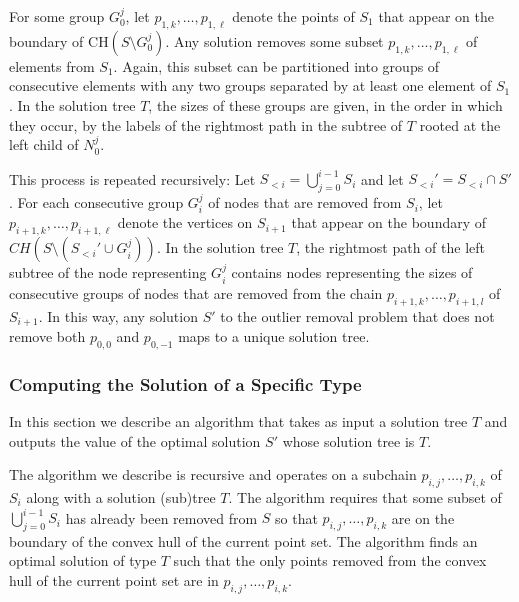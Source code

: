 \documentclass[lotsofwhite]{patmorin}
\newcommand{\ch}{\mathrm{CH}}
\begin{document}
For some group $G_0^j$, let $p_{1,k}, \ldots, p_{1,\ell}$ denote the
points of $S_1$ that appear on the boundary of $\ch(S\setminus
G_0^j)$.  Any solution removes some subset $p_{1,k},\ldots,
p_{1,\ell}$ of elements from $S_1$.  Again, this subset can be
partitioned into groups of consecutive elements with any two groups
separated by at least one element of $S_1$.  In the solution tree $T$,
the sizes of these groups are given, in the order in which they occur,
by the labels of the rightmost path in the subtree of $T$ rooted at
the left child of $N_0^j$.

This process is repeated recursively: Let
$S_{<i}=\bigcup_{j=0}^{i-1}S_i$ and let $S_{<i}'=S_{<i}\cap S'$.  For
each consecutive group $G_i^j$ of nodes that are removed from $S_i$,
let $p_{i+1,k}, \ldots, p_{i+1,\ell}$ denote the vertices on $S_{i+1}$
that appear on the boundary of $CH(S \setminus (S_{<i}'\cup G_i^j))$.
In the solution tree $T$, the rightmost path of the left subtree of
the node representing $G_i^j$ contains nodes representing the sizes of
consecutive groups of nodes that are removed from the chain
$p_{i+1,k}, \ldots, p_{i+1,l}$ of $S_{i+1}$.  In this way, any
solution $S'$ to the outlier removal problem that does not remove both
$p_{0,0}$ and $p_{0,-1}$ maps to a unique solution tree.



\subsubsection{Computing the Solution of a Specific Type}

In this section we describe an algorithm that takes as input a
solution tree $T$ and outputs the value of the optimal solution $S'$
whose solution tree is $T$.

The algorithm we describe is recursive and operates on a subchain
$p_{i,j},\ldots,p_{i,k}$ of $S_i$ along with a solution (sub)tree $T$.  The
algorithm requires that some subset of $\bigcup_{j=0}^{i-1}S_i$ has
already been removed from $S$ so that $p_{i,j},\ldots,p_{i,k}$ are on
the boundary of the convex hull of the current point set.  The
algorithm finds an optimal solution of type $T$ such that the only
points removed from the convex hull of the current point set are in
$p_{i,j},\ldots,p_{i,k}$.
\end{document}
